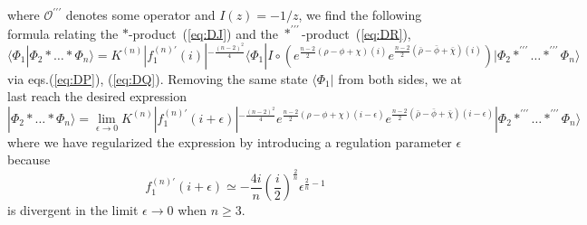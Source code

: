 \documentclass[a4paper,12pt]{article}
\newcommand{\cO}{\mathcal{O}}
\newcommand{\tp}{\prime\prime\prime}
\begin{document}
where $\cO^{\tp}$ denotes some operator and $I(z)=-1/z$, we find the following formula relating 
the $*$-product~(\ref{eq:DJ}) and the $*^{\tp}$-product~(\ref{eq:DR}), 
\begin{equation}
\langle\Phi_1|\Phi_2*\ldots *\Phi_n\rangle=K^{(n)}|f_1^{(n)\prime}(i)|^{-\frac{(n-2)^2}{4}}\langle\Phi_1|
I\circ \left(e^{\frac{n-2}{2}(\rho-\phi+\chi)(i)}e^{\frac{n-2}{2}(\bar{\rho}-\bar{\phi}+\bar{\chi})(i)}
\right)|\Phi_2*^{\tp}\ldots *^{\tp}
\Phi_n\rangle \label{eq:DS}
\end{equation}
via eqs.(\ref{eq:DP}), (\ref{eq:DQ}). Removing the same state $\langle\Phi_1|$ from both sides, 
we at last reach the desired expression 
\begin{equation}
|\Phi_2*\ldots *\Phi_n\rangle=\lim_{\epsilon\to 0}K^{(n)}|f_1^{(n)\prime}(i+\epsilon)|^{-\frac{(n-2)^2}{4}}
e^{\frac{n-2}{2}(\rho-\phi+\chi)(i-\epsilon)}e^{\frac{n-2}{2}(\bar{\rho}-\bar{\phi}+\bar{\chi})
(i-\epsilon)}|\Phi_2*^{\tp}\ldots *^{\tp}
\Phi_n\rangle \label{eq:DT}
\end{equation}
where we have regularized the expression by introducing a regulation parameter $\epsilon$ because 
\[ f^{(n)\prime}_1(i+\epsilon)\simeq -\frac{4i}{n}\left(\frac{i}{2}\right)^{\frac{2}{n}}
\epsilon^{\frac{2}{n}-1} \]
is divergent in the limit $\epsilon\to 0$ when $n\ge 3$.
\end{document}
